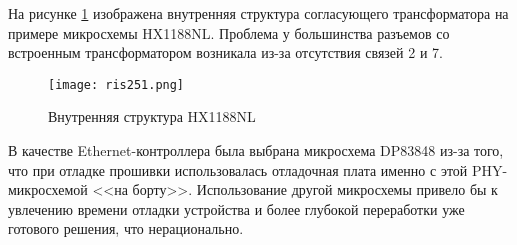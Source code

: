 На рисунке \ref{ris:251} изображена внутренняя структура согласующего трансформатора на примере микросхемы
HX1188NL. Проблема у большинства разъемов со встроенным трансформатором возникала из-за
отсутствия связей 2 и 7. 

\begin{figure}[H]
  \centering
  \texttt{[image: ris251.png]}
  \caption{Внутренняя структура HX1188NL}
  \label{ris:251}
\end{figure}

В качестве Ethernet-контроллера была выбрана микросхема DP83848 \cite{DP83848:datasheet} из-за того, 
что при отладке прошивки использовалась отладочная плата именно с этой PHY-микросхемой <<на борту>>. 
Использование другой микросхемы привело бы к увлечению времени отладки устройства и более глубокой 
переработки уже готового решения, что нерационально.




